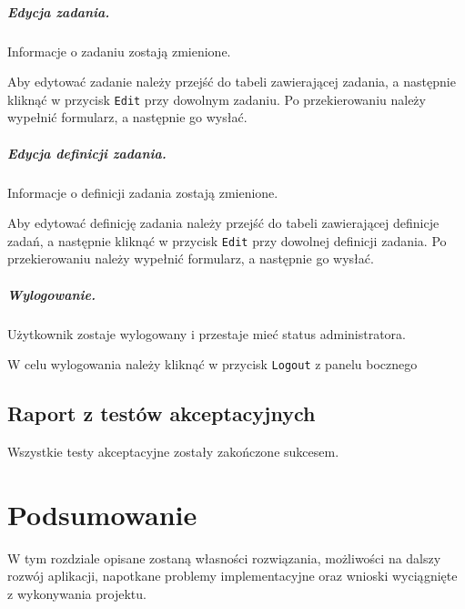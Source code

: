 \documentclass[a4paper,11pt,twoside]{report}
\theoremstyle{definition}
\begin{document}
            \paragraph{Edycja zadania.}  
                \noindent Informacje o zadaniu zostają zmienione.
                
                Aby edytować zadanie należy przejść do tabeli zawierającej zadania, a następnie kliknąć w przycisk \texttt{Edit} przy dowolnym zadaniu. Po przekierowaniu należy wypełnić formularz, a następnie go wysłać.

            \paragraph{Edycja definicji zadania.}    
                \noindent Informacje o definicji zadania zostają zmienione.
                
                Aby edytować definicję zadania należy przejść do tabeli zawierającej definicje zadań, a następnie kliknąć w przycisk \texttt{Edit} przy dowolnej definicji zadania. Po przekierowaniu należy wypełnić formularz, a następnie go wysłać.

            \paragraph{Wylogowanie.}
                \noindent Użytkownik zostaje wylogowany i przestaje mieć status administratora.

                W celu wylogowania należy kliknąć w przycisk \texttt{Logout} z panelu bocznego


            \subsubsection{}    
            
    \section{Raport z testów akceptacyjnych}
    
        Wszystkie testy akceptacyjne zostały zakończone sukcesem.

\chapter{Podsumowanie}

    W tym rozdziale opisane zostaną własności rozwiązania, możliwości na dalszy rozwój aplikacji,
    napotkane problemy implementacyjne oraz wnioski wyciągnięte z wykonywania projektu.
\end{document}
